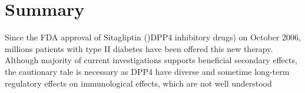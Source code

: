 \section{\label{chap:Sum} Summary}
Since the FDA approval of Sitagliptin ()DPP4 inhibitory drugs) on October 2006, millions patients with type II diabetes have been offered this new therapy. Although majority of current investigations supports beneficial secondary effects, the cautionary tale is necessary as DPP4 have diverse and sometime long-term regulatory effects on immunological effects, which are not well understood
